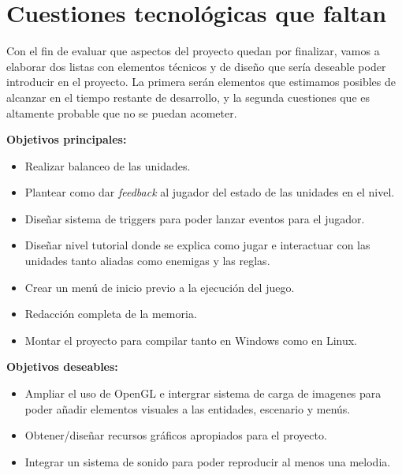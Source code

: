 \section{Cuestiones tecnológicas que faltan}
Con el fin de evaluar que aspectos del proyecto quedan por finalizar, vamos a elaborar dos listas con
elementos técnicos y de diseño que sería deseable poder introducir en el proyecto. La primera serán
elementos que estimamos posibles de alcanzar en el tiempo restante de desarrollo, y la segunda
cuestiones que es altamente probable que no se puedan acometer.

\textbf{Objetivos principales:}
\begin{itemize}
	\item Realizar balanceo de las unidades.

	\item Plantear como dar \textit{feedback} al jugador del estado de las unidades en el nivel.

	\item Diseñar sistema de triggers para poder lanzar eventos para el jugador.

	\item Diseñar nivel tutorial donde se explica como jugar e interactuar con las unidades
	tanto aliadas como enemigas y las reglas.

	\item Crear un menú de inicio previo a la ejecución del juego.

	\item Redacción completa de la memoria.

	\item Montar el proyecto para compilar tanto en Windows como en Linux.
\end{itemize}

\textbf{Objetivos deseables:}
\begin{itemize}
	\item Ampliar el uso de OpenGL e intergrar sistema de carga de imagenes para poder añadir
	elementos visuales a las entidades, escenario y menús.

	\item Obtener/diseñar recursos gráficos apropiados para el proyecto.

	\item Integrar un sistema de sonido para poder reproducir al menos una melodia.
\end{itemize}
